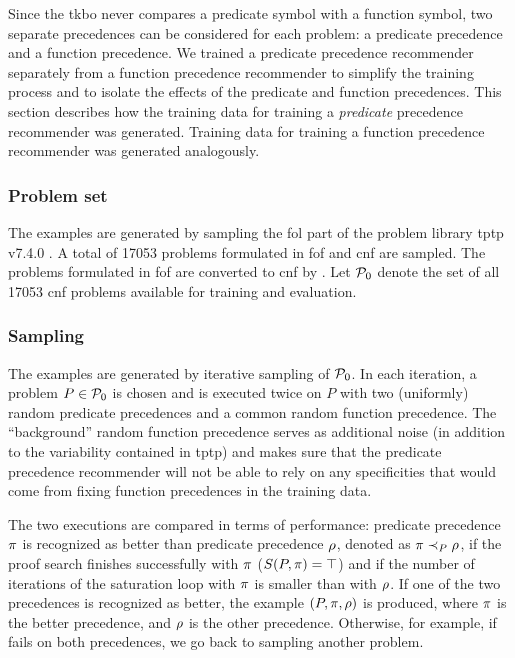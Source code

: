Since the \gls{tkbo} never compares a predicate symbol with a function symbol,
two separate precedences can be considered for each problem:
a predicate precedence and a function precedence.
We trained a predicate precedence recommender separately from a function precedence recommender
to simplify the training process and to isolate the effects of the predicate and function precedences.
This section describes how the training data for training a \emph{predicate} precedence recommender was generated.
Training data for training a function precedence recommender was generated analogously.

\subsubsection{Problem set}
The examples are generated by sampling the \gls{fol} part of the problem library \gls{tptp} v7.4.0 \cite{10.1007/978-3-030-29436-6_29}.
A total of \num{17053} problems formulated in \gls{fof} and \gls{cnf} are sampled.
The problems formulated in \gls{fof} are converted to \gls{cnf} by \Vampire{}.
Let $\operatorname{\mathcal{P}_{0}}$ denote the set of all \num{17053} \gls{cnf} problems available for training and evaluation.

\subsubsection{Sampling}

The examples are generated by iterative sampling of $\operatorname{\mathcal{P}_{0}}$.
In each iteration, a problem $P \in \operatorname{\mathcal{P}_{0}}$ is chosen and \Vampire{} is executed twice on $P$
with two (uniformly) random predicate precedences and a common random function precedence.
The ``background'' random function precedence serves as additional noise (in addition to the variability 
contained in \gls{tptp}) and makes sure that the predicate precedence recommender
will not be able to rely on any specificities that would come from fixing function precedences in the training data.

The two executions are compared in terms of performance:
predicate precedence $\pi$ is recognized as better than predicate precedence $\rho$,
denoted as $\pi \prec_{P} \rho$,
if the proof search finishes successfully with $\pi$ ($S(P, \pi) = \top$)
and if the number of iterations of the saturation loop with $\pi$ is smaller than with $\rho$.
If one of the two precedences is recognized as better,
the example $(P, \pi, \rho)$ is produced,
where $\pi$ is the better precedence,
and $\rho$ is the other precedence.
Otherwise, for example, if \Vampire{} fails on both precedences, we go back to sampling another problem.

